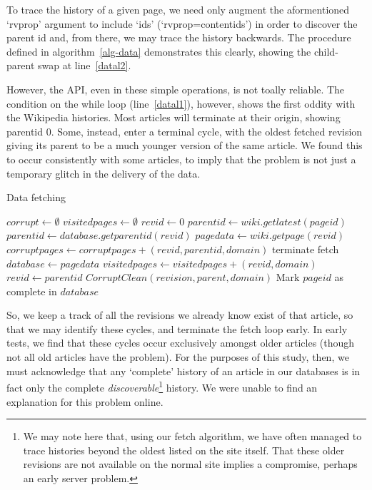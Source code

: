 To trace the history of a given page, we need only augment the
aformentioned `rvprop' argument to include `ids'
(`rvprop=content{\textbar}ids') in order to discover the parent id and, from
there, we may trace the history backwards. The procedure defined in
algorithm~\ref{alg-data} demonstrates this clearly, showing the
child-parent swap at line~\ref{datal2}. 

However, the API, even in these simple operations, is not toally
reliable. The condition on the while loop (line~\ref{datal1}),
however, shows the first oddity with the Wikipedia histories. Most
articles will terminate at their origin, showing parentid 0. Some,
instead, enter a terminal cycle, with the oldest fetched revision
giving its parent to be a much younger version of the same article. We
found this to occur consistently with some articles, to imply that the
problem is not just a temporary glitch in the delivery of the data.

\begin{algorithm}
  \caption{Data fetching}\label{alg-data}
  \begin{algorithmic}
    \State $corrupt \gets \emptyset$
    \State $visitedpages \gets \emptyset$
    \State $revid \gets 0$
    \State $parentid \gets wiki.getlatest(pageid)$
    \label{datal1} 
    \State $parentid \gets database.getparentid(revid)$
    \Else
    \State $pagedata \gets wiki.getpage(revid)$
    \EndIf
    \label{datal3}
    \State $corruptpages \gets corruptpages + (revid, parentid, domain)$
    \Else
    \State terminate fetch\label{datal4}
    \EndIf
    \Else
    \State $database \gets page data$
    \EndIf
    \State $visitedpages \gets visitedpages + (revid, domain)$
    \State $revid \gets parentid$\label{datal2}
    \EndWhile
    \State $CorruptClean(revision, parent, domain)$
    \EndFor
    \State Mark $pageid$ as complete in $database$
    \EndProcedure
  \end{algorithmic}
\end{algorithm}

So, we keep a track of all the revisions we already know exist of that
article, so that we may identify these cycles, and terminate the fetch
loop early. In early tests, we find that these cycles occur
exclusively amongst older articles (though not all old articles have
the problem). For the purposes of this study, then, we must
acknowledge that any `complete' history of an article in our databases
is in fact only the complete \textit{discoverable}\footnote{We may
  note here that, using our fetch algorithm, we have often managed to
  trace histories beyond the oldest listed on the site itself. That
  these older revisions are not available on the normal site implies a
  compromise, perhaps an early server problem.}  history. We were
unable to find an explanation for this problem online.

